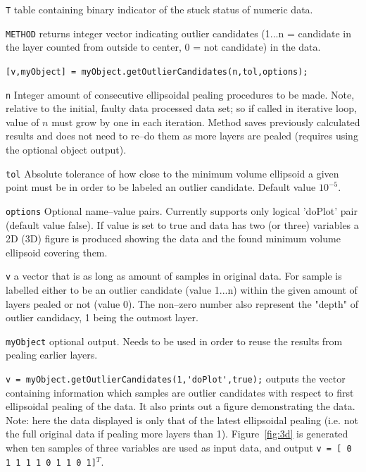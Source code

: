 \documentclass[twoside,a4paper]{refart}
\begin{document}
\verb|T| table containing binary indicator of the stuck status of numeric data.

\verb|METHOD| returns integer vector indicating outlier candidates (1...n = candidate in the layer counted from outside to center, 0 = not candidate) in the data.

\verb|[v,myObject] = myObject.getOutlierCandidates(n,tol,options);|

\verb|n| Integer amount of consecutive ellipsoidal pealing procedures to be made. Note, relative to the initial, faulty data processed data set; so if called in iterative loop, value of $n$ must grow by one in each iteration. Method saves previously calculated results and does not need to re--do them as more layers are pealed (requires using the optional object output).

\verb|tol| Absolute tolerance of how close to the minimum volume ellipsoid a given point must be in order to be labeled an outlier candidate. Default value $10^{-5}$.

\verb|options| Optional name--value pairs. Currently supports only logical 'doPlot' pair (default value false). If value is set to true and data has two (or three) variables a 2D (3D) figure is produced showing the data and the found minimum volume ellipsoid covering them.

\verb|v| a vector that is as long as amount of samples in original data. For sample is labelled either to be an outlier candidate (value 1...n) within the given amount of layers pealed or not (value 0). The non--zero number also represent the "depth" of outlier candidacy, 1 being the outmost layer.

\verb|myObject| optional output. Needs to be used in order to reuse the results from pealing earlier layers.

\verb|v = myObject.getOutlierCandidates(1,'doPlot',true);| outputs the vector containing information which samples are outlier candidates with respect to first ellipsoidal pealing of the data. It also prints out a figure demonstrating the data. Note: here the data displayed is only that of the latest ellipsoidal pealing (i.e. not the full original data if pealing more layers than 1). Figure~\ref{fig:3d} is generated when ten samples of three variables are used as input data, and output \verb|v = [ 0 1 1 1 1 0 1 1 0 1]|$^T$.
\end{document}
